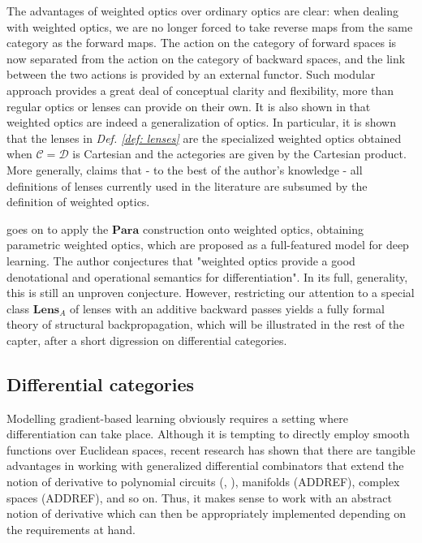 \documentclass[12pt,a4paper,openright,twoside]{report}
\theoremstyle{plain}
\theoremstyle{definition}
\begin{document}
The advantages of weighted optics over ordinary optics are clear: when dealing with weighted optics, we are no longer forced to take reverse maps from the same category as the forward maps. The action on the category of forward spaces is now separated from the action on the category of backward spaces, and the link between the two actions is provided by an external functor. Such modular approach provides a great deal of conceptual clarity and flexibility, more than regular optics or lenses can provide on their own. It is also shown in \cite{gavranovic2024fundamental} that weighted optics are indeed a generalization of optics. In particular, it is shown that the lenses in \textit{Def. \ref{def: lenses}} are the specialized weighted optics obtained when $\mathcal{C} = \mathcal{D}$ is Cartesian and the actegories are given by the Cartesian product. More generally, \cite{gavranovic2024fundamental} claims that - to the best of the author's knowledge - all definitions of lenses currently used in the literature are subsumed by the definition of weighted optics.


\cite{gavranovic2024fundamental} goes on to apply the $\mathbf{Para}$ construction onto weighted optics, obtaining parametric weighted optics, which are proposed as a full-featured model for deep learning. The author conjectures that "weighted optics provide a good denotational and operational semantics for differentiation". In its full, generality, this is still an unproven conjecture. However, restricting our attention to a special class $\mathbf{Lens}_A$ of lenses with an additive backward passes yields a fully formal theory of structural backpropagation, which will be illustrated in the rest of the capter, after a short digression on differential categories.





\subsection{Differential categories}
\label{subsec: diffcats}


Modelling gradient-based learning obviously requires a setting where differentiation can take place. Although it is tempting to directly employ smooth functions over Euclidean spaces, recent research has shown that there are tangible advantages in working with generalized differential combinators that extend the notion of derivative to polynomial circuits (\cite{wilson2022categories}, \cite{wilson2021reverse}), manifolds (ADDREF), complex spaces (ADDREF), and so on.  Thus, it makes sense to work with an abstract notion of derivative which can then be appropriately implemented depending on the requirements at hand.
\end{document}
